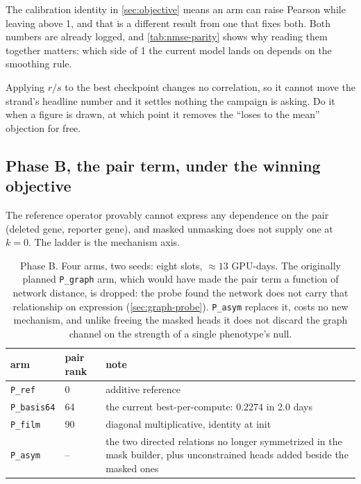  The calibration
identity in \cref{sec:objective} means an arm can raise Pearson while leaving 
above 1, and that is a different result from one that fixes both. Both numbers are already
logged, and \cref{tab:nmse-parity} shows why reading them together matters: which side of 1
the current model lands on depends on the smoothing rule.

 Applying $r/s$ to the best
checkpoint changes no correlation, so it cannot move the strand's headline number and it
settles nothing the campaign is asking. Do it when a figure is drawn, at which point it
removes the ``loses to the mean'' objection for free.

\subsection{Phase B, the pair term, under the winning objective}

The reference operator provably cannot express any dependence on the pair (deleted gene,
reporter gene), and masked unmasking does not supply one at $k = 0$. The ladder is the
mechanism axis.

\begin{table}[htbp]
\centering\small
\begin{tabular}{llp{54mm}}
\toprule
arm & pair rank & note \\
\midrule
\texttt{P\_ref}      & 0  & additive reference \\
\texttt{P\_basis64}  & 64 & the current best-per-compute: $0.2274$ in 2.0 days \\
\texttt{P\_film}     & 90 & diagonal multiplicative, identity at init \\
\texttt{P\_asym}     & -- & the two directed relations no longer symmetrized in the mask builder, plus unconstrained heads added beside the masked ones \\
\bottomrule
\end{tabular}
\caption[]{Phase B. Four arms, two seeds: eight slots, $\approx 13$ GPU-days. The originally
planned \texttt{P\_graph} arm, which would have made the pair term a function of network
distance, is dropped: the probe found the network does not carry that relationship on
expression (\cref{sec:graph-probe}). \texttt{P\_asym} replaces it, costs no new mechanism,
and unlike freeing the masked heads it does not discard the graph channel on the strength of
a single phenotype's null.}
\label{tab:phase-b}
\end{table}

